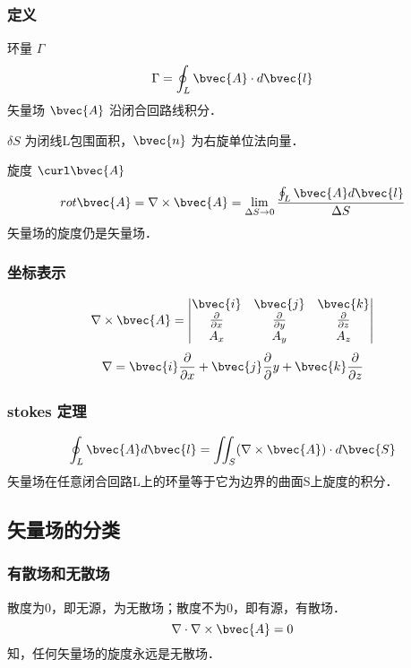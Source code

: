 \subsubsection{定义}
环量 $\Gamma$
\begin{equation}\label{VecAnl_eq10}
\Gamma=\oint_L \bvec{A} \cdot d \bvec{l}
\end{equation}
矢量场 $\bvec{A}$ 沿闭合回路线积分．

$\delta S$ 为闭线L包围面积，$\bvec{n}$ 为右旋单位法向量．

旋度 $\curl\bvec{A}$
\begin{equation}\label{VecAnl_eq11}
rot \bvec{A}=\nabla \times \bvec{A}=\lim_{\Delta S \to 0} \frac{\oint_L \bvec{A} d\bvec{l}}{\Delta S}
\end{equation}
矢量场的旋度仍是矢量场．

\subsubsection{坐标表示}
\begin{equation}\label{VecAnl_eq12}
\nabla \times \bvec{A}=
\begin{vmatrix}
\bvec{i} & \bvec{j} & \bvec{k} \\
\frac{\partial}{\partial x} & \frac{\partial}{\partial y} & \frac{\partial}{\partial z}\\
A_x & A_y & A_z
\end{vmatrix}
\end{equation}
\begin{equation}\label{VecAnl_eq13}
\nabla = \bvec{i}\frac{\partial}{\partial x}+ \bvec{j} \frac{\partial}{\partial}y + \bvec{k} \frac{\partial}{\partial z}
\end{equation}

\subsubsection{stokes 定理}
\begin{equation}\label{VecAnl_eq14}
\oint_L \bvec{A} d\bvec{l}=\iint_S (\nabla \times \bvec{A})\cdot d\bvec{S}
\end{equation}
矢量场在任意闭合回路L上的环量等于它为边界的曲面S上旋度的积分．

\subsection{矢量场的分类}
\subsubsection{有散场和无散场}
散度为0，即无源，为无散场；散度不为0，即有源，有散场．
\begin{equation}\label{VecAnl_eq24}
\nabla\cdot\nabla\times\bvec{A}=0
\end{equation}
知，任何矢量场的旋度永远是无散场．

